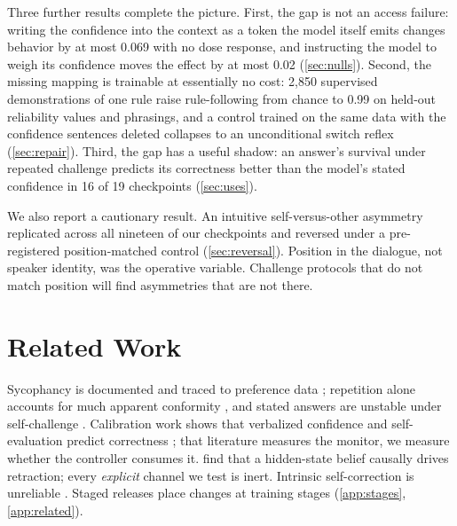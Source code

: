 \documentclass{article}
\begin{document}
Three further results complete the picture. First, the gap is not an access failure: writing the confidence into the context as a token the model itself emits changes behavior by at most 0.069 with no dose response, and instructing the model to weigh its confidence moves the effect by at most 0.02 (\cref{sec:nulls}). Second, the missing mapping is trainable at essentially no cost: 2{,}850 supervised demonstrations of one rule raise rule-following from chance to 0.99 on held-out reliability values and phrasings, and a control trained on the same data with the confidence sentences deleted collapses to an unconditional switch reflex (\cref{sec:repair}). Third, the gap has a useful shadow: an answer's survival under repeated challenge predicts its correctness better than the model's stated confidence in 16 of 19 checkpoints (\cref{sec:uses}).

We also report a cautionary result. An intuitive self-versus-other asymmetry replicated across all nineteen of our checkpoints and reversed under a pre-registered position-matched control (\cref{sec:reversal}). Position in the dialogue, not speaker identity, was the operative variable. Challenge protocols that do not match position will find asymmetries that are not there.

\section{Related Work}
\label{sec:related}
Sycophancy is documented and traced to preference data \citep{sharma2024sycophancy, perez2023discovering}; repetition alone accounts for much apparent conformity \citep{hu2026conformity}, and stated answers are unstable under self-challenge \citep{saadat2026certainty}. Calibration work shows that verbalized confidence and self-evaluation predict correctness \citep{lin2022teaching, tian2023just, xiong2024can, kadavath2022language}; that literature measures the monitor, we measure whether the controller consumes it. \citet{yang2025retraction} find that a hidden-state belief causally drives retraction; every \emph{explicit} channel we test is inert. Intrinsic self-correction is unreliable \citep{huang2024large}. Staged releases \citep{olmo2025, lambert2024tulu, tunstall2024zephyr} place changes at training stages (\cref{app:stages}, \cref{app:related}).
\end{document}
